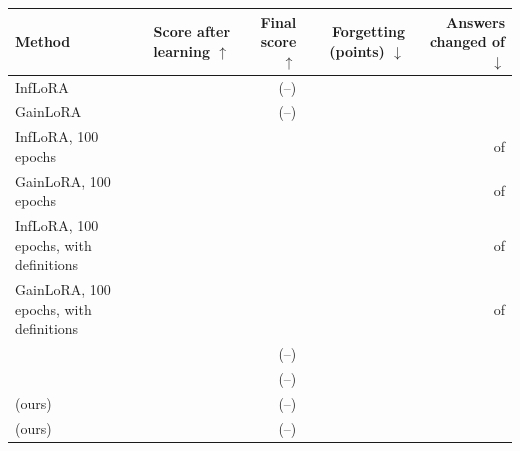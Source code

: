 {\footnotesize\setlength{\tabcolsep}{2.5pt}\begin{tabular}{lrrrr}
    \toprule
    Method & \shortstack[r]{Score after\\learning $\uparrow$} & \shortstack[r]{Final\\score $\uparrow$} & \shortstack[r]{Forgetting\\(points) $\downarrow$} & \shortstack[r]{Answers changed\\of \AudSeedsCompared{} $\downarrow$} \\
    \midrule
    InfLoRA & \AudSeedsInfloraLearned{} & \AudSeedsInfloraAP{} {\scriptsize (\AudSeedsInfloraAPLow{}--\AudSeedsInfloraAPHigh{})} & \AudSeedsInfloraFT{} & \AudSeedsInfloraChanged{} \\
    GainLoRA & \AudSeedsGainloraLearned{} & \AudSeedsGainloraAP{} {\scriptsize (\AudSeedsGainloraAPLow{}--\AudSeedsGainloraAPHigh{})} & \AudSeedsGainloraFT{} & \AudSeedsGainloraChanged{} \\
    InfLoRA, 100 epochs & \AudFullInfloraLearned{} & \AudFullInfloraAP{} & \AudFullInfloraFT{} & \AudFullInfloraChanged{} of \AudFullCompared{} \\
    GainLoRA, 100 epochs & \AudFullGainloraLearned{} & \AudFullGainloraAP{} & \AudFullGainloraFT{} & \AudFullGainloraChanged{} of \AudFullCompared{} \\
    InfLoRA, 100 epochs, with definitions & \AudFullDefOriginalInfloraLearned{} & \AudFullDefOriginalInfloraAP{} & \AudFullDefOriginalInfloraFT{} & \AudFullDefOriginalInfloraChanged{} of \AudFullDefCompared{} \\
    GainLoRA, 100 epochs, with definitions & \AudFullDefOriginalGainloraLearned{} & \AudFullDefOriginalGainloraAP{} & \AudFullDefOriginalGainloraFT{} & \AudFullDefOriginalGainloraChanged{} of \AudFullDefCompared{} \\
    \midrule
    \plain{} & \AudSeedsPlainLearned{} & \AudSeedsPlainAP{} {\scriptsize (\AudSeedsPlainAPLow{}--\AudSeedsPlainAPHigh{})} & \AudSeedsPlainFT{} & \AudSeedsPlainChanged{} \\
    \centre{} & \AudSeedsCentreLearned{} & \AudSeedsCentreAP{} {\scriptsize (\AudSeedsCentreAPLow{}--\AudSeedsCentreAPHigh{})} & \AudSeedsCentreFT{} & \AudSeedsCentreChanged{} \\
    \recog{} (ours) & \AudSeedsRidgeLearned{} & \AudSeedsRidgeAP{} {\scriptsize (\AudSeedsRidgeAPLow{}--\AudSeedsRidgeAPHigh{})} & \AudSeedsRidgeFT{} & \AudSeedsRidgeChanged{} \\
    \handicap{} (ours) & \AudSeedsHandicapLearned{} & \AudSeedsHandicapAP{} {\scriptsize (\AudSeedsHandicapAPLow{}--\AudSeedsHandicapAPHigh{})} & \AudSeedsHandicapFT{} & \AudSeedsHandicapChanged{} \\

\end{tabular}}
